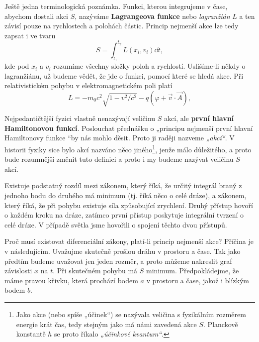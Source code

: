     Ještě jedna terminologická poznámka. Funkci, kterou integrujeme v čase, abychom dostali akci
    \(S\), nazýváme \textbf{Lagrangeova funkce} nebo \emph{lagranžián} \(L\) a ten závisí pouze na
    rychlostech a polohách částic. Princip nejmenší akce lze tedy zapsat i ve tvaru
    \begin{equation*}
      S = \int_{t_1}^{t_2}L(x_i,v_i)\dd{t},
    \end{equation*}
    kde pod \(x_i\) a \(v_i\) rozumíme všechny složky poloh a rychlostí. Uslišíme-li někdy o
    lagranžiánu, už budeme vědět, že jde o funkci, pomocí které se hledá akce. Při relativistickém
    pohybu v elektromagnetickém poli platí
    \begin{equation*}
      L = - m_0c^2\sqrt{1 - {v^2}/{c^2}} - q(\varphi + \vec{v}\cdot\vec{A}),
    \end{equation*}

    Nejpedantičtější fyzici vlastně nenazývají veličinu \(S\) akcí, ale \textbf{první hlavní
    Hamiltonovou funkcí}. Poslouchat přednášku o „principu nejmenší první hlavní Hamiltonovy funkce
    “by nás mohlo děsit. Proto ji raději nazveme \emph{„akcí“}. V historii fyziky sice bylo akcí
    nazváno něco jiného\footnote{Jako akce (nebo spíše „účinek“) se nazývala veličina s fyzikálním
    rozměrem energie krát čas, tedy stejným jako má námi zavedená akce \(S\). Planckově konstantě
    \(h\) se proto říkalo \emph{„účinkové kvantum“}.}, jenže málo důležitého, a proto bude
    rozumnější změnit tuto definici a proto i my budeme nazývat veličinu \(S\) akcí.


    Existuje podstatný rozdíl mezi zákonem, který říká, že určitý integrál braný z jednoho bodu do
    druhého má minimum (tj. říká něco o celé dráze), a zákonem, který říká, že při pohybu existuje
    síla způsobující zrychlení. Druhý přístup hovoří o každém kroku na dráze, zatímco první přístup
    poskytuje integrální tvrzení o celé dráze. V případě světla jsme hovořili o spojení těchto dvou
    přístupů. 
    
    Proč musí existovat diferenciální zákony, platí-li princip nejmenší akce? Příčina je v
    následujícím. Uvažujme skutečně prošlou dráhu v prostoru a čase. Tak jako předtím budeme
    uvažovat jen jeden rozměr, a proto můžeme nakreslit graf závislosti \(x\) na \(t\). Při
    skutečném pohybu má \(S\) minimum. Předpokládejme, že máme pravou křivku, která prochází bodem
    \(\underline{a}\) v prostoru a čase, jakož i blízkým bodem \(\underline{b}\).

